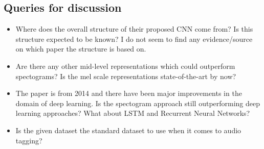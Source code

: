 \documentclass[a4paper]{article}
\begin{document}
\subsection{Queries for discussion}

\begin{itemize}
	\item Where does the overall structure of their proposed CNN come from? Is this structure expected to be known? I do not seem to find any evidence/source on which paper the structure is based on.
	\item Are there any other mid-level representations which could outperform spectograms? Is the mel scale representations state-of-the-art by now?
	\item The paper is from 2014 and there have been major improvements in the domain of deep learning. Is the spectogram approach still outperforming deep learning approaches? What about LSTM and Recurrent Neural Networks?
	\item Is the given dataset the standard dataset to use when it comes to audio tagging?
\end{itemize}
\end{document}
